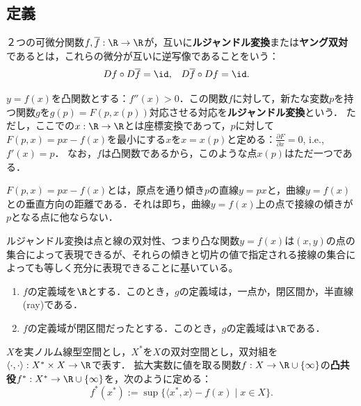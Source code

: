 \documentclass[uplatex,dvipdfmx]{jsreport}
\begin{document}
\subsection{定義}

\begin{definition}
    ２つの可微分関数$f,\overline{f}:\R\to\R$が，互いに\textbf{ルジャンドル変換}または\textbf{ヤング双対}であるとは，これらの微分が互いに逆写像であることをいう：
    \begin{align*}
        Df\circ D\overline{f}&=\id,&D\overline{f}\circ Df&=\id.
    \end{align*}
\end{definition}

\begin{definition}
    $y=f(x)$を凸関数とする：$f''(x)>0$．この関数$f$に対して，新たな変数$p$を持つ関数$g$を$g(p)=F(p,x(p))$対応させる対応を\textbf{ルジャンドル変換}という．
    ただし，ここでの$x:\R\to\R$とは座標変換であって，$p$に対して$F(p,x)=px-f(x)$を最小にする$x$を$x=x(p)$と定める：$\frac{\partial F}{\partial x}=0$, i.e., $f'(x)=p$．
    なお，$f$は凸関数であるから，このような点$x(p)$はただ一つである．
\end{definition}
\begin{remark}
    $F(p,x)=px-f(x)$とは，原点を通り傾き$p$の直線$y=px$と，曲線$y=f(x)$との垂直方向の距離である．それは即ち，曲線$y=f(x)$上の点で接線の傾きが$p$となる点に他ならない．

    ルジャンドル変換は点と線の双対性、つまり凸な関数$y = f (x)$は$(x, y)$の点の集合によって表現できるが、それらの傾きと切片の値で指定される接線の集合によっても等しく充分に表現できることに基いている。
\end{remark}

\begin{proposition}\mbox{}
    \begin{enumerate}
        \item $f$の定義域を$\R$とする．このとき，$g$の定義域は，一点か，閉区間か，半直線(ray)である．
        \item $f$の定義域が閉区間だったとする．このとき，$g$の定義域は$\R$である．
    \end{enumerate}
\end{proposition}

\begin{definition}
    $X$を実ノルム線型空間とし，$X^*$を$X$の双対空間とし，双対組を$\langle\cdot,\cdot\rangle:X^*\times X\to\R$で表す．
    拡大実数に値を取る関数$f:X\to\R\cup\{\infty\}$の\textbf{凸共役}$f^*:X^*\to\R\cup\{\infty\}$を，次のように定める：
    \[ f^*(x^*):=\sup\{\langle x^*,x\rangle-f(x)\mid x\in X\}. \]
\end{definition}
\end{document}
